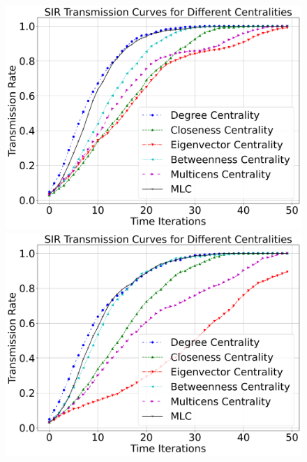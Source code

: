 \documentclass[10pt,letterpaper]{article}
\begin{document}
\begin{figure}[h!]
\begin{minipage}[b]{0.25\linewidth}
	\centering
	\includegraphics[width=\textwidth]{figs/fig20-hif2a_arnt-k1top2.png}
	\subcaption{}
\end{minipage}
\hspace{0.5cm}
\begin{minipage}[b]{0.25\linewidth}
	\centering
	\includegraphics[width=\textwidth]{figs/fig21-hif3a_arnt-k2top2.png}
	\subcaption{}
\end{minipage}
\hspace{0.5cm}
\begin{minipage}[b]{0.25\linewidth}
	\centering

\end{minipage}
\end{figure}
\end{document}
